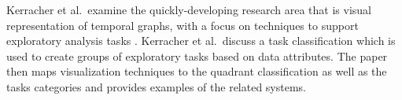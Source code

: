



Kerracher et al.\ examine the quickly-developing research area that is visual representation of temporal graphs, with a focus on techniques to support exploratory analysis tasks \cite{kerracher2015visual}.
Kerracher et al.\ discuss a task classification which is used to create groups of exploratory tasks based on data attributes. The paper then maps visualization techniques to the quadrant classification as well as the tasks categories and provides examples of the related systems.




